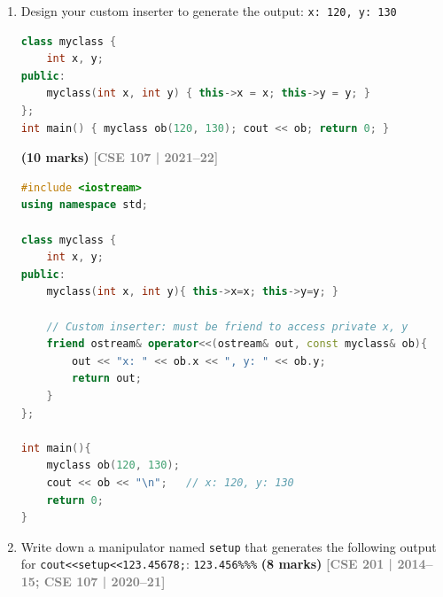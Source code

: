 \documentclass[12pt,a3paper]{article}
\newcommand{\yr}[1]{\hfill\textcolor{gray}{\small\textbf{[#1]}}}
\newcommand{\mk}[1]{\textcolor{orange!70!black}{\small\textbf{(#1 marks)}}}
\begin{document}
\begin{enumerate}
\begin{tcolorbox}
\begin{lstlisting}[language=C++]
int main() {
    Complex c;
    if (cin >> c) {
        cout << "Output: " << c << "\n";
    } else {
        cout << "Improper input detected. Stream failed.\n";
    }
    return 0;
}
\end{lstlisting}

\end{tcolorbox}


\item Design your custom inserter to generate the output: \texttt{x: 120, y: 130}
\begin{lstlisting}[language=C++]
class myclass {
    int x, y;
public:
    myclass(int x, int y) { this->x = x; this->y = y; }
};
int main() { myclass ob(120, 130); cout << ob; return 0; }
\end{lstlisting}
\mk{10}
\yr{CSE 107 | 2021--22}
\begin{tcolorbox}[enhanced,breakable,ansbox,colback=cA!4,colframe=cA,
  boxrule=0.8pt,arc=5pt,
  title={\textbf{Answer --- Custom inserter for myclass printing x: 120, y: 130}},
  fonttitle=\bfseries\color{white},colbacktitle=cA]

\begin{lstlisting}[language=C++]
#include <iostream>
using namespace std;

class myclass {
    int x, y;
public:
    myclass(int x, int y){ this->x=x; this->y=y; }

    // Custom inserter: must be friend to access private x, y
    friend ostream& operator<<(ostream& out, const myclass& ob){
        out << "x: " << ob.x << ", y: " << ob.y;
        return out;
    }
};

int main(){
    myclass ob(120, 130);
    cout << ob << "\n";   // x: 120, y: 130
    return 0;
}
\end{lstlisting}

\end{tcolorbox}


\item Write down a manipulator named \texttt{setup} that generates the following output for \texttt{cout<<setup<<123.45678;}: \quad \texttt{123.456\%\%\%} \mk{8}
\yr{CSE 201 | 2014--15; CSE 107 | 2020--21}

\begin{tcolorbox}[enhanced,breakable,ansbox,colback=cA!4,colframe=cA,
  boxrule=0.8pt,arc=5pt,
  title={\textbf{Answer --- setup manipulator producing 123.456\%\%\%}},
  fonttitle=\bfseries\color{white},colbacktitle=cA]


\end{tcolorbox}
\end{enumerate}
\end{document}
